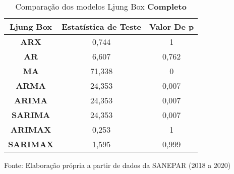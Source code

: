 \begin{table}[H]
	\centering
	\caption{Comparação dos modelos Ljung Box \textbf{Completo} }\label{tb:lbcm}
	\begin{tabular}{@{}ccc@{}}
		\toprule
		\textbf{Ljung Box} & \textbf{Estatística de Teste} & \textbf{Valor De p} \\ \midrule
		\textbf{ARX}       & 0,744                         & 1                   \\
		\textbf{AR}        & 6,607                         & 0,762               \\
		\textbf{MA}        & 71,338                        & 0                   \\
		\textbf{ARMA}      & 24,353                        & 0,007               \\
		\textbf{ARIMA}     & 24,353                        & 0,007               \\
		\textbf{SARIMA}    & 24,353                        & 0,007               \\
		\textbf{ARIMAX}    & 0,253                         & 1                   \\
		\textbf{SARIMAX}   & 1,595                         & 0,999               \\ \bottomrule
	\end{tabular}

	
	Fonte: Elaboração própria a partir de dados da SANEPAR (2018 a 2020)
\end{table}

